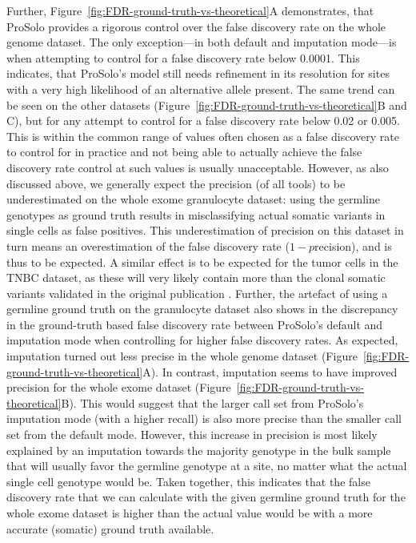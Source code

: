 \documentclass[authoryear,preprint,11pt]{scrartcl}
\begin{document}
Further, Figure~\ref{fig:FDR-ground-truth-vs-theoretical}A demonstrates, that ProSolo provides a rigorous control over the false discovery rate on the whole genome dataset.
The only exception---in both default and imputation mode---is when attempting to control for a false discovery rate below 0.0001.
This indicates, that ProSolo's model still needs refinement in its resolution for sites with a very high likelihood of an alternative allele present.
The same trend can be seen on the other datasets (Figure~\ref{fig:FDR-ground-truth-vs-theoretical}B and C), but for any attempt to control for a false discovery rate below 0.02 or 0.005.
This is within the common range of values often chosen as a false discovery rate to control for in practice and not being able to actually achieve the false discovery rate control at such values is usually unacceptable.
However, as also discussed above, we generally expect the precision (of all tools) to be underestimated on the whole exome granulocyte dataset: using the germline genotypes as ground truth results in misclassifying actual somatic variants in single cells as false positives.
This underestimation of precision on this dataset in turn means an overestimation of the false discovery rate ($1 - p$recision), and is thus to be expected.
A similar effect is to be expected for the tumor cells in the TNBC dataset, as these will very likely contain more than the clonal somatic variants validated in the original publication \citep{wang_clonal_2014}.
Further, the artefact of using a germline ground truth on the granulocyte dataset also shows in the discrepancy in the ground-truth based false discovery rate between ProSolo's default and imputation mode when controlling for higher false discovery rates.
As expected, imputation turned out less precise in the whole genome dataset (Figure~\ref{fig:FDR-ground-truth-vs-theoretical}A).
In contrast, imputation seems to have improved precision for the whole exome dataset (Figure~\ref{fig:FDR-ground-truth-vs-theoretical}B).
This would suggest that the larger call set from ProSolo's imputation mode (with a higher recall) is also more precise than the smaller call set from the default mode.
However, this increase in precision is most likely explained by an imputation towards the majority genotype in the bulk sample that will usually favor the germline genotype at a site, no matter what the actual single cell genotype would be.
Taken together, this indicates that the false discovery rate that we can calculate with the given germline ground truth for the whole exome dataset is higher than the actual value would be with a more accurate (somatic) ground truth available.
\end{document}
